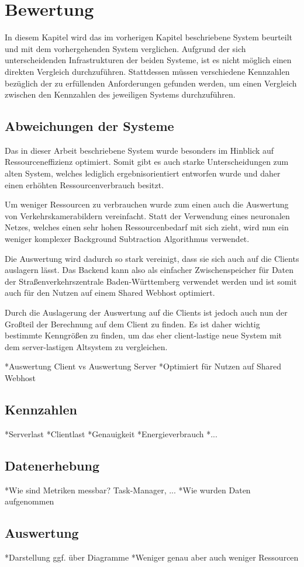 \chapter{Bewertung}
In diesem Kapitel wird das im vorherigen Kapitel beschriebene System beurteilt und mit dem vorhergehenden System verglichen.
Aufgrund der sich unterscheidenden Infrastrukturen der beiden Systeme, ist es nicht möglich einen direkten Vergleich durchzuführen.
Stattdessen müssen verschiedene Kennzahlen bezüglich der zu erfüllenden Anforderungen gefunden werden, um einen Vergleich zwischen den Kennzahlen des jeweiligen Systems durchzuführen.

\section{Abweichungen der Systeme}
Das in dieser Arbeit beschriebene System wurde besonders im Hinblick auf Ressourceneffizienz optimiert.
Somit gibt es auch starke Unterscheidungen zum alten System, welches lediglich ergebnisorientiert entworfen wurde und daher einen erhöhten Ressourcenverbrauch besitzt.

Um weniger Ressourcen zu verbrauchen wurde zum einen auch die Auswertung von Verkehrskamerabildern vereinfacht.
Statt der Verwendung eines neuronalen Netzes, welches einen sehr hohen Ressourcenbedarf mit sich zieht, wird nun ein weniger komplexer Background Subtraction Algorithmus verwendet.

Die Auswertung wird dadurch so stark vereinigt, dass sie sich auch auf die Clients auslagern lässt.
Das Backend kann also als einfacher Zwischenspeicher für Daten der Straßenverkehrszentrale Baden-Württemberg verwendet werden und ist somit auch für den Nutzen auf einem Shared Webhost optimiert.

Durch die Auslagerung der Auswertung auf die Clients ist jedoch auch nun der Großteil der Berechnung auf dem Client zu finden.
Es ist daher wichtig bestimmte Kenngrößen zu finden, um das eher client-lastige neue System mit dem server-lastigen Altsystem zu vergleichen.

*Auswertung Client vs Auswertung Server\newline
*Optimiert für Nutzen auf Shared Webhost\newline

\section{Kennzahlen}
*Serverlast\newline
*Clientlast\newline
*Genauigkeit\newline
*Energieverbrauch\newline
*...\newline

\section{Datenerhebung}
*Wie sind Metriken messbar? Task-Manager, ...\newline
*Wie wurden Daten aufgenommen\newline

\section{Auswertung}
*Darstellung ggf. über Diagramme\newline
*Weniger genau aber auch weniger Ressourcen\newline
